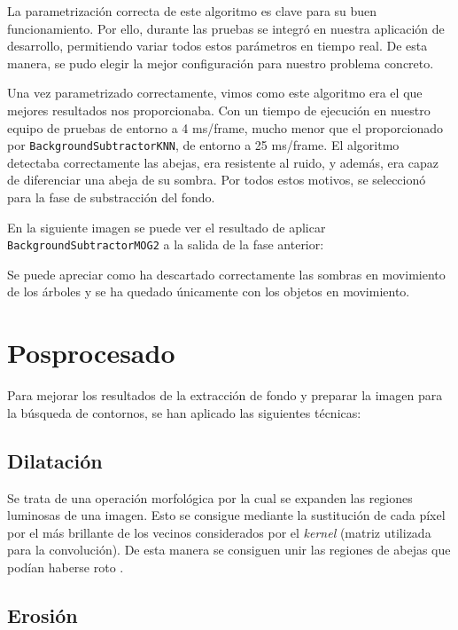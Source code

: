 La parametrización correcta de este algoritmo es clave para su buen
funcionamiento. Por ello, durante las pruebas se integró en nuestra
aplicación de desarrollo, permitiendo variar todos estos parámetros en
tiempo real. De esta manera, se pudo elegir la mejor configuración para
nuestro problema concreto.

Una vez parametrizado correctamente, vimos como este algoritmo era el
que mejores resultados nos proporcionaba. Con un tiempo de ejecución en
nuestro equipo de pruebas de entorno a 4 ms/frame, mucho menor que el
proporcionado por \texttt{BackgroundSubtractorKNN}, de entorno a
25 ms/frame. El algoritmo detectaba correctamente las abejas, era
resistente al ruido, y además, era capaz de diferenciar una abeja de su
sombra. Por todos estos motivos, se seleccionó para la fase de
substracción del fondo.

En la siguiente imagen se puede ver el resultado de aplicar
\\ \texttt{BackgroundSubtractorMOG2} a la salida de la fase anterior:


Se puede apreciar como ha descartado correctamente las sombras en
movimiento de los árboles y se ha quedado únicamente con los objetos en
movimiento.

\section{Posprocesado}\label{posprocesado}

Para mejorar los resultados de la extracción de fondo y preparar la
imagen para la búsqueda de contornos, se han aplicado las siguientes
técnicas:

\subsection{Dilatación}\label{dilatacion}

Se trata de una operación morfológica por la cual se expanden las
regiones luminosas de una imagen. Esto se consigue mediante la
sustitución de cada píxel por el más brillante de los vecinos
considerados por el \emph{kernel} (matriz utilizada para la
convolución). De esta manera se consiguen unir las regiones de abejas
que podían haberse roto \citep{book:mastering_opencv}.

\subsection{Erosión}\label{erosion}

